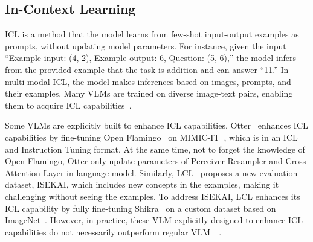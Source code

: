 \model


\subsection{In-Context Learning}
\label{sec:icl}
ICL is a method that the model learns from few-shot input-output examples as prompts, without updating model parameters.
% 
For instance, given the input ``Example input: (4, 2), Example output: 6, Question: (5, 6),'' the model infers from the provided example that the task is addition and can answer ``11.''
% 
In multi-modal ICL, the model makes inferences based on images, prompts, and their examples.
% 
Many VLMs are trained on diverse image-text pairs, enabling them to acquire ICL capabilities~\cite{UnderstandingImprovingInContextLearningVisionlanguageModels}.

Some VLMs are explicitly built to enhance ICL capabilities.
% 
Otter~\cite{OtterMultiModalModelInContextInstructionTuninga} enhances ICL capabilities by fine-tuning Open Flamingo~\cite{OpenFlamingoOpenSourceFrameworkTrainingLargeAutoregressiveVisionLanguageModelsa} on MIMIC-IT~\cite{MIMICITMultiModalInContextInstructionTuninga}, which is in an ICL and Instruction Tuning format. 
% 
At the same time, not to forget the knowledge of Open Flamingo, Otter only update parameters of Perceiver Resampler and Cross Attention Layer in language model.
% 
Similarly, LCL~\cite{LinkContextLearningMultimodalLLMsa} proposes a new evaluation dataset, ISEKAI, which includes new concepts in the examples, making it challenging without seeing the examples.
% 
To address ISEKAI, LCL enhances its ICL capability by fully fine-tuning Shikra~\cite{ShikraUnleashingMultimodalLLMReferentialDialogueMagic} on a custom dataset based on ImageNet~\cite{Imagenetlargescalehierarchicalimagedatabase}.
% 
However, in practice, these VLM explicitly designed to enhance ICL capabilities do not necessarily outperform regular VLM~\cite{UnderstandingImprovingInContextLearningVisionlanguageModels}~\cite{VLICLBenchDevilDetailsBenchmarkingMultimodalInContextLearning}.